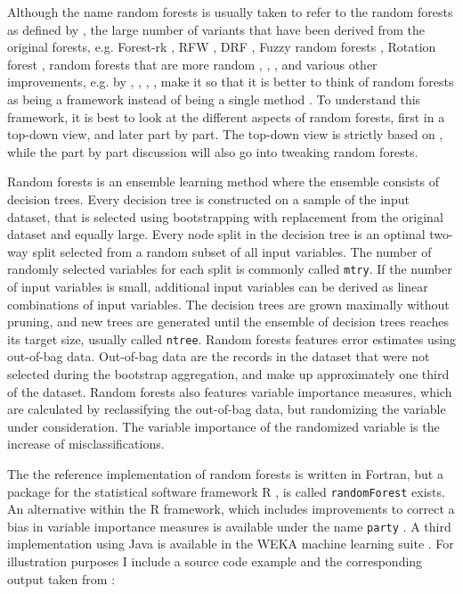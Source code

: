 \documentclass[a4paper,man,12pt,apacite]{apa6} %
\begin{document}
Although the name random forests is usually taken to refer to the random
forests as defined by \cite{breiman2001random}, the large number of
variants that have been derived from the original forests, e.g.
Forest-rk \cite{bernard2008forest}, RFW \cite{maudes2012random},
DRF \cite{bernard2012dynamic}, Fuzzy random forests \cite{bonissone2008fuzzy},
Rotation forest \cite{rodriguez2006rotation}, random forests that are
more random \cite{geurts2006extremely}, \cite{liu2005maximizing},
\cite{cutler2001pert}, and various other improvements, e.g. by
\cite{banfield2007comparison}, \cite{robnik2004improving},
\cite{strobl2009introduction}, \cite{zhang2012bias}, make it so that it
is better to think of random forests as being a framework instead of being
a single method \cite{wpRF}.
To understand this framework, it is best to look at the different aspects
of random forests, first in a top-down view, and later part by part.
The top-down view is strictly based on \cite{breiman2001random},
while the part by part discussion will also go into tweaking random forests.

Random forests is an ensemble learning method where the ensemble consists
of decision trees.
Every decision tree is constructed on a sample of the input dataset,
that is selected using bootstrapping with replacement from the original
dataset and equally large.
Every node split in the decision tree is an optimal two-way split selected
from a random subset of all input variables.
The number of randomly selected variables for each split is commonly called
\texttt{mtry}.
If the number of input variables is small, additional input variables can be
derived as linear combinations of input variables.
The decision trees are grown maximally without pruning,
and new trees are generated until the ensemble of decision trees reaches its
target size, usually called \texttt{ntree}.
Random forests features error estimates using out-of-bag data.
Out-of-bag data are the records in the dataset that were not selected during
the bootstrap aggregation, and make up approximately one third of the dataset.
Random forests also features variable importance measures,
which are calculated by reclassifying the out-of-bag data,
but randomizing the variable under consideration.
The variable importance of the randomized variable is the increase of
misclassifications.

The the reference implementation of random forests is written in Fortran,
but a package for the statistical software framework R \cite{rproject2012},
is called \texttt{randomForest} \cite{liaw2002classification} exists.
An alternative within the R framework, which includes improvements
to correct a bias in variable
importance measures is available under the name \texttt{party}
\cite{strobl2008conditional}.
A third implementation using Java is available in the WEKA machine learning
suite \cite{hall2009weka}.
For illustration purposes I include a source code example and the
corresponding output taken from \cite{strobl2008conditional}:
\end{document}
